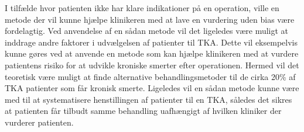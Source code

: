 I tilfælde hvor patienten ikke har klare indikationer på en operation, ville en metode der vil kunne hjælpe klinikeren med at lave en vurdering uden bias være fordelagtig. Ved anvendelse af en sådan metode vil det ligeledes være muligt at inddrage andre faktorer i udvælgelsen af patienter til TKA. Dette vil eksempelvis kunne gøres ved at anvende en metode som kan hjælpe klinikeren med at vurdere patientens risiko for at udvikle kroniske smerter efter operationen. Hermed vil det teoretisk være muligt at finde alternative behandlingsmetoder til de cirka 20\% af TKA patienter som får kronisk smerte. Ligeledes vil en sådan metode kunne være med til at systematisere henstillingen af patienter til en TKA, således det sikres at patienten får tilbudt samme behandling uafhængigt af hvilken kliniker der vurderer patienten. 



   
